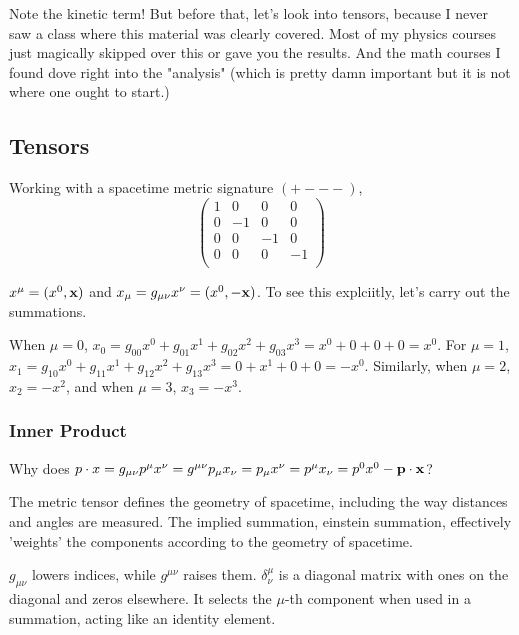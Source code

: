 Note the kinetic term!
But before that, let's look into tensors, because I never saw a class where this material was clearly covered.
Most of my physics courses just magically skipped over this or gave you the results.
And the math courses I found dove right into the "analysis" (which is pretty damn important but it is not where one
ought to start.)





\subsection{Tensors}

Working with a spacetime metric signature $(+ - - -)$,
$$
\begin{pmatrix}
    1 & 0  & 0  & 0  \\
    0 & -1 & 0  & 0  \\
    0 & 0  & -1 & 0  \\
    0 & 0  & 0  & -1 \\
\end{pmatrix}
$$

$x^\mu = (x^0, \boldsymbol{\mathbf{x}})$ and $x_\mu = g_{\mu\nu} x^\nu = (x^0, -\boldsymbol{\mathbf{x}})$.
To see this explciitly, let's carry out the summations.

When $\mu = 0$, $x_0 = g_{00}x^0 + g_{01}x^1 + g_{02}x^2 + g_{03}x^3 = x^0 + 0 + 0 +0 = x^0$.
For $\mu = 1$, $x_1 = g_{10}x^0 + g_{11}x^1 + g_{12}x^2 + g_{13}x^3 = 0 + x^1 + 0 +0 = -x^0$.
Similarly, when $\mu = 2$, $x_2 = -x^2$, and when $\mu =3$, $x_3 = -x^3$.


\subsubsection{Inner Product}

Why does $p \cdot x = g_{\mu\nu} p^\mu x^\nu = g^{\mu\nu} p_\mu x_\nu = p_\mu x^\nu = p^\mu x_\nu = p^0 x^0 - \boldsymbol{\mathbf{p}}\cdot\boldsymbol{\mathbf{x}}$?

The metric tensor defines the geometry of spacetime, including the way distances and angles are measured.
The implied summation, einstein summation, effectively 'weights' the components according to the geometry of spacetime.

$g_{\mu\nu}$ lowers indices, while $g^{\mu\nu}$ raises them.
$\delta^{\mu}_{\nu}$ is a diagonal matrix with ones on the diagonal and zeros elsewhere.
It selects the $\mu$-th component when used in a summation, acting like an identity element.

